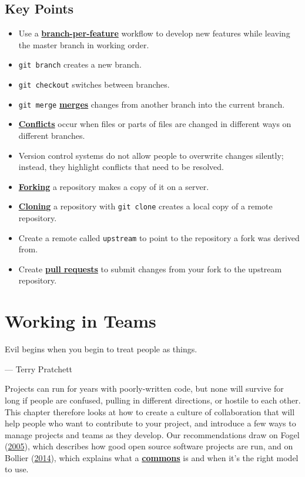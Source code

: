 \documentclass[
]{krantz}
\providecommand{\tightlist}{%
  \setlength{\itemsep}{0pt}\setlength{\parskip}{0pt}}
\renewenvironment{quote}{\begin{VF}}{\end{VF}}
\newcommand{\gref}[2]{\hyperlink{#2}{\textbf{#1}}}
\begin{document}
\hypertarget{git-advanced-keypoints}{%
\section{Key Points}\label{git-advanced-keypoints}}

\begin{itemize}
\tightlist
\item
  Use a \gref{branch-per-feature}{branch\_per\_feature} workflow to develop new features while leaving the master branch in working order.
\item
  \texttt{git\ branch} creates a new branch.
\item
  \texttt{git\ checkout} switches between branches.
\item
  \texttt{git\ merge} \gref{merges}{git\_merge} changes from another branch into the current branch.
\item
  \gref{Conflicts}{git\_conflict} occur when files or parts of files are changed in different ways on different branches.
\item
  Version control systems do not allow people to overwrite changes silently;
  instead, they highlight conflicts that need to be resolved.
\item
  \gref{Forking}{git\_fork} a repository makes a copy of it on a server.
\item
  \gref{Cloning}{git\_clone} a repository with \texttt{git\ clone} creates a local copy of a remote repository.
\item
  Create a remote called \texttt{upstream} to point to the repository a fork was derived from.
\item
  Create \gref{pull requests}{pull\_request} to submit changes from your fork to the upstream repository.
\end{itemize}

\hypertarget{teams}{%
\chapter{Working in Teams}\label{teams}}

\begin{quote}
Evil begins when you begin to treat people as things.

--- Terry Pratchett
\end{quote}

Projects can run for years with poorly-written code,
but none will survive for long if people are confused,
pulling in different directions,
or hostile to each other.
This chapter therefore looks at how to create a culture of collaboration
that will help people who want to contribute to your project,
and introduce a few ways to manage projects and teams as they develop.
Our recommendations draw on Fogel (\protect\hyperlink{ref-Foge2005}{2005}),
which describes how good open source software projects are run,
and on Bollier (\protect\hyperlink{ref-Boll2014}{2014}),
which explains what a \gref{commons}{commons} is
and when it's the right model to use.
\end{document}
